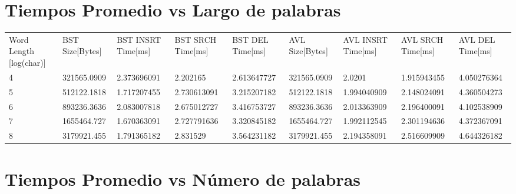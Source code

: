 \documentclass[12pt,letterpaper,hidelinks]{extarticle}
\begin{document}
\appendix
\chapter{Tiempos Promedio vs Largo de palabras}

\begin{table}[]
\centering
\begin{tabular}{lllllllll}
Word Length {[}log(char){]} & BST Size{[}Bytes{]} & BST INSRT Time{[}ms{]} & BST SRCH Time{[}ms{]} & BST DEL Time{[}ms{]} & AVL Size{[}Bytes{]} & AVL INSRT Time{[}ms{]} & AVL SRCH Time{[}ms{]} & AVL DEL Time{[}ms{]} \\
4                           & 321565.0909         & 2.373696091            & 2.202165              & 2.613647727          & 321565.0909         & 2.0201                 & 1.915943455           & 4.050276364          \\
5                           & 512122.1818         & 1.717207455            & 2.730613091           & 3.215207182          & 512122.1818         & 1.994040909            & 2.148024091           & 4.360504273          \\
6                           & 893236.3636         & 2.083007818            & 2.675012727           & 3.416753727          & 893236.3636         & 2.013363909            & 2.196400091           & 4.102538909          \\
7                           & 1655464.727         & 1.670363091            & 2.727791636           & 3.320845182          & 1655464.727         & 1.992112545            & 2.301194636           & 4.372367091          \\
8                           & 3179921.455         & 1.791365182            & 2.831529              & 3.564231182          & 3179921.455         & 2.194358091            & 2.516609909           & 4.644326182
\end{tabular}
\end{table}

\chapter{Tiempos Promedio vs Número de palabras}
\end{document}
